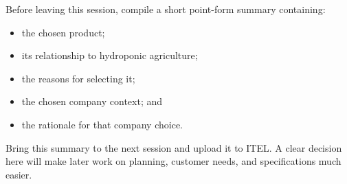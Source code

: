 Before leaving this session, compile a short point-form summary containing:
\begin{itemize}
    \item the chosen product;
    \item its relationship to hydroponic agriculture;
    \item the reasons for selecting it;
    \item the chosen company context; and
    \item the rationale for that company choice.
\end{itemize}

Bring this summary to the next session and upload it to ITEL. A clear decision here will make later work on planning, customer needs, and specifications much easier.
